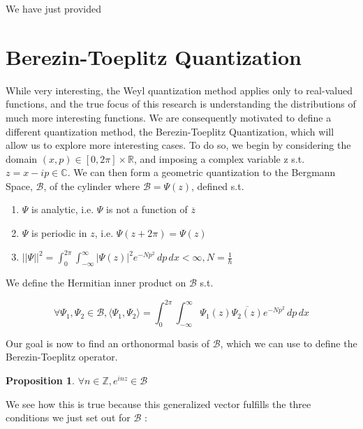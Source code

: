 \documentclass{article}
\newtheorem{proposition}[theorem]{Proposition}
\begin{document}
We have just provided

\section{Berezin-Toeplitz Quantization}

While very interesting, the Weyl quantization method applies only to real-valued functions, and the true focus of this research is understanding the distributions of much more interesting functions. We are consequently motivated to define a different quantization method, the Berezin-Toeplitz Quantization, which will allow us to explore more interesting cases. To do so, we begin by considering the domain $(x,p)\in [0,2\pi]\times\mathbb{R}$, and imposing a complex variable z s.t. $z = x-ip \in \mathbb{C}$. We can then form a geometric quantization to the Bergmann Space, $\mathcal{B}$, of the cylinder where $\mathcal{B} = \Psi(z)$, defined s.t.
\begin{enumerate}
\item $\Psi$ is analytic, i.e. $\Psi$ is not a function of $\overline{z}$
\item $\Psi$ is periodic in $z$, i.e. $\Psi(z + 2\pi) = \Psi(z)$
\item $\lvert\lvert\Psi\rvert\rvert^2 =  \int^{2\pi}_{0} \! \int^{\infty}_{-\infty}  \lvert\Psi(z)\rvert^{2}e^{-Np^{2}} \,dp \,dx< \infty, N=\frac{1}{\hbar}$
\end{enumerate}

We define the Hermitian inner product on $\mathcal{B}$ s.t.

$$ \forall \Psi_{1},\Psi_{2} \in \mathcal{B}, \langle\Psi_{1},\Psi_{2}\rangle = \int^{2\pi}_{0} \! \int^{\infty}_{-\infty}  \Psi_{1}(z)\overline{\Psi_{2}(z)}e^{-Np^{2}} \,dp \,dx$$

Our goal is now to find an orthonormal basis of $\mathcal{B}$, which we can use to define the Berezin-Toeplitz operator. \begin{proposition} $\forall n \in\mathbb{Z}, e^{inz}\in\mathcal{B}$ \end{proposition} We see how this is true because this generalized vector fulfills the three conditions we just set out for $\mathcal{B}$ :
\end{document}
